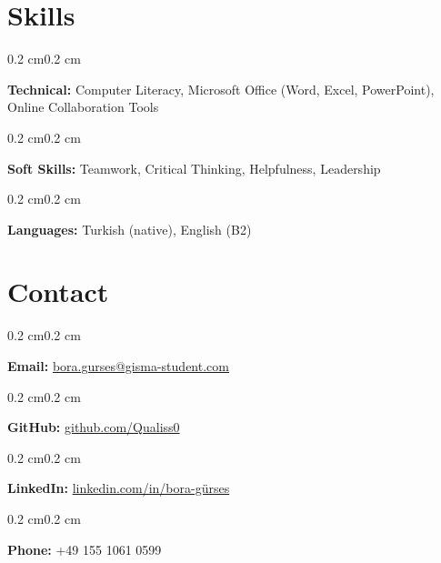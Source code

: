 \documentclass[10pt, letterpaper]{article}
\newenvironment{onecolentry}{
    \begin{adjustwidth}{0.2 cm}{0.2 cm}
}{
    \end{adjustwidth}
}
\begin{document}
\section{Skills}
\begin{onecolentry}
\textbf{Technical:} Computer Literacy, Microsoft Office (Word, Excel, PowerPoint), Online Collaboration Tools
\end{onecolentry}

\vspace{0.1cm}

\begin{onecolentry}
\textbf{Soft Skills:} Teamwork, Critical Thinking, Helpfulness, Leadership
\end{onecolentry}

\vspace{0.1cm}

\begin{onecolentry}
\textbf{Languages:} Turkish (native), English (B2)
\end{onecolentry}

\section{Contact}
\begin{onecolentry}
\textbf{Email:} \href{mailto:bora.gurses@gisma-student.com}{bora.gurses@gisma-student.com}
\end{onecolentry}
\begin{onecolentry}
\textbf{GitHub:} \href{https://github.com/Qualiss0}{github.com/Qualiss0}
\end{onecolentry}
\begin{onecolentry}
\textbf{LinkedIn:} \href{https://linkedin.com/in/bora-gürses-29b0232ba}{linkedin.com/in/bora-gürses}
\end{onecolentry}
\begin{onecolentry}
\textbf{Phone:} +49 155 1061 0599
\end{onecolentry}
\end{document}
